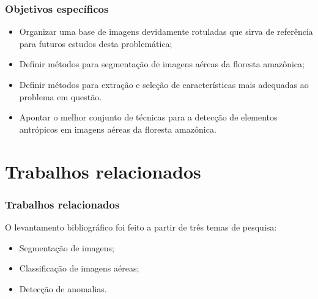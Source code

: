 \documentclass[t]{beamer}
\begin{document}
\begin{frame}[c]
\frametitle{Objetivos específicos}

\begin{itemize}
    \item Organizar uma base de imagens devidamente rotuladas que sirva de referência para futuros estudos desta problemática;
    \item Definir métodos para segmentação de imagens aéreas da floresta amazônica;
    \item Definir métodos para extração e seleção de características mais adequadas ao problema em questão.
    \item Apontar o melhor conjunto de técnicas para a detecção de elementos antrópicos em imagens aéreas da floresta amazônica.
\end{itemize}

\end{frame}


\section{Trabalhos relacionados}

\begin{frame}[c]
	\frametitle{Trabalhos relacionados}

	O levantamento bibliográfico foi feito a partir de três temas de pesquisa:
	\vspace{0.5cm}
	\begin{itemize}
		\item Segmentação de imagens;
		\item Classificação de imagens aéreas;
		\item Detecção de anomalias.
	\end{itemize}
\end{frame}
\end{document}
